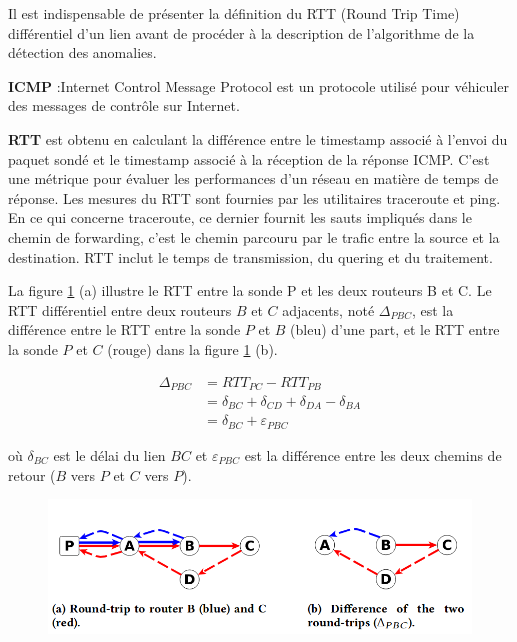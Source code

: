 Il est indispensable de présenter la définition du RTT  (Round Trip Time)  différentiel d'un lien avant de procéder à la description de l'algorithme de la détection des anomalies. 


\begin{tcolorbox}
	
	\textbf{ICMP} :Internet Control Message Protocol est un protocole utilisé pour véhiculer des messages de contrôle sur Internet.
	
	\textbf{ RTT} est obtenu en calculant la différence entre le timestamp associé à l'envoi du paquet sondé  et le timestamp associé à la réception de la réponse ICMP. C'est une métrique pour évaluer les performances d'un réseau en matière de temps de réponse. Les mesures du RTT sont fournies par les utilitaires traceroute et ping. En ce qui concerne traceroute,  ce dernier fournit les sauts impliqués dans le  chemin de forwarding, c'est le chemin parcouru par le trafic entre la source et la destination.  RTT inclut le temps de transmission, du quering et  du traitement. 
\end{tcolorbox}

La figure 	\ref{fig:rtt-differ} (a)  illustre le RTT entre la sonde P et les deux routeurs B et C. Le RTT différentiel  entre deux routeurs $B$ et $C$ adjacents, noté $\Delta_{PBC}$, est la différence entre le RTT entre la sonde $P$ et $B$ (bleu) d'une part, et le RTT entre la sonde $P$ et $C$ (rouge) dans la figure 	\ref{fig:rtt-differ} (b). 

\begin{align*}
\Delta_{PBC} &= RTT_{PC} - RTT_{PB} \\
&= \delta_{BC} + \delta_{CD} + \delta_{DA}  - \delta_{BA} \\
&= \delta_{BC} + \varepsilon_{PBC}
\end{align*}

où $\delta_{BC}$ est le délai du lien $BC$ et $\varepsilon_{PBC}$ est la différence entre les deux chemins de retour ($B$ vers $P$ et $C$ vers $P$). 
\begin{figure}[H]
	\centering
	\includegraphics[width=0.7\linewidth]{illustrations/rtt-differ}
	\caption{}
	\label{fig:rtt-differ}
\end{figure}

